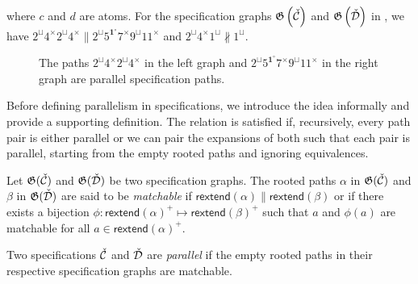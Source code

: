 where $c$ and $d$ are atoms. For the specification graphs $\mathfrak{G}\left(\check{\mathcal{C}}\right)$ and $\mathfrak{G}\left(\check{\mathcal{D}}\right)$ in , we have $2^\sqcup4^\times2^\sqcup4^\times \parallel 2^\sqcup5^{\mathbf{1}^\circ}7^\times9^\sqcup11^\times$ and $2^\sqcup4^\times1^\sqcup \nparallel 1^\sqcup$.
\begin{figure}[ht!]
    \centering
    
    \caption{The paths $2^\sqcup4^\times2^\sqcup4^\times$ in the left graph and $2^\sqcup5^{\mathbf{1}^\circ}7^\times9^\sqcup11^\times$ in the right graph are parallel specification paths.}
    \label{fig:para_path}
\end{figure}

Before defining parallelism in specifications, we introduce the idea informally and provide a supporting definition. The relation is satisfied if, recursively, every path pair is either parallel or we can pair the expansions of both such that each pair is parallel, starting from the empty rooted paths and ignoring equivalences.

Let $\mathfrak{G}(\check{\mathcal{C}})$ and $\mathfrak{G}(\check{\mathcal{D}})$ be two specification graphs. The rooted paths $\alpha$ in $\mathfrak{G}(\check{\mathcal{C}})$ and $\beta$ in $\mathfrak{G}(\check{\mathcal{D}})$ are said to be \emph{matchable} if $\textsf{rextend}(\alpha) \parallel \textsf{rextend}(\beta)$ or if there exists a bijection $\phi: \textsf{rextend}(\alpha)^+ \mapsto \textsf{rextend}(\beta)^+$ such that $a$ and $\phi(a)$ are matchable for all $a\in \textsf{rextend}(\alpha)^+$.

\begin{definition}\label{def:parspec}
Two specifications $\check{\mathcal{C}}$ and $\check{\mathcal{D}}$ are \emph{parallel} if the empty rooted paths in their respective specification graphs are matchable.
\end{definition}

